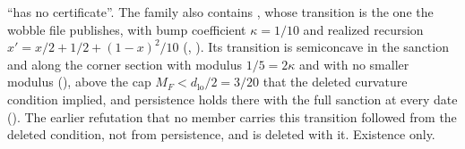 \begin{itemize}[leftmargin=1.4em,itemsep=1pt]
``has no certificate''.
The family also contains
, whose transition is the one the wobble file
publishes, with bump coefficient $\kappa=1/10$ and realized recursion
$x'=x/2+1/2+(1-x)^2/10$ (,
). Its transition is semiconcave in the
sanction and along the corner section with modulus $1/5=2\kappa$ and with no
smaller modulus (), above the cap
$M_F<d_{\mathrm{lo}}/2=3/20$ that the deleted curvature condition implied, and
persistence holds there with the full sanction at every date
(). The earlier refutation that no member
carries this transition followed from the deleted condition, not from persistence,
and is deleted with it. Existence only.
\end{itemize}

